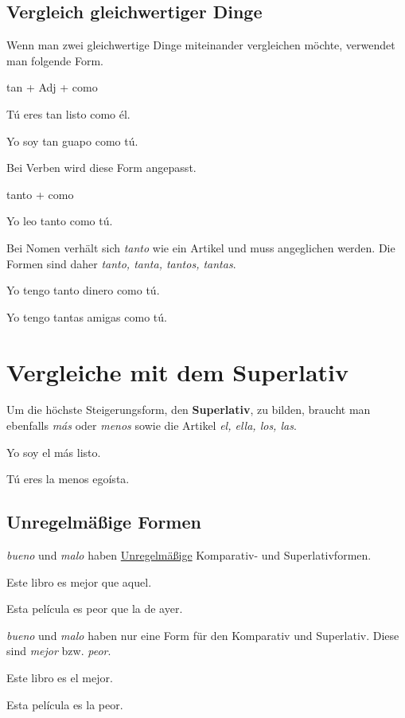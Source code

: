 \subsection*{Vergleich gleichwertiger Dinge}
Wenn man zwei gleichwertige Dinge miteinander vergleichen
möchte, verwendet man folgende Form.
\begin{gramatica}
    \item tan + Adj + como
\end{gramatica}
\begin{ejemplos}
    \item T\'u eres tan listo como \'el.
    \item Yo soy tan guapo como t\'u.
\end{ejemplos}
Bei Verben wird diese Form angepasst.
\begin{gramatica}
    \item tanto + como
\end{gramatica}
\begin{ejemplos}
    \item Yo leo tanto como t\'u.
\end{ejemplos}
Bei Nomen verhält sich \textit{tanto} wie ein Artikel und muss
angeglichen werden. Die Formen sind daher 
\textit{tanto, tanta, tantos, tantas}.
\begin{ejemplos}
    \item Yo tengo tanto dinero como t\'u.
    \item Yo tengo tantas amigas como t\'u.
\end{ejemplos}
\section{Vergleiche mit dem Superlativ}
Um die höchste Steigerungsform, den \textbf{Superlativ}, zu 
bilden, braucht man ebenfalls \textit{m\'as} oder \textit{menos}
sowie die Artikel \textit{el, ella, los, las}.
\begin{ejemplos}
    \item Yo soy el m\'as listo.
    \item T\'u eres la menos ego\'ista. 
\end{ejemplos}
\subsection*{Unregelmäßige Formen}
\textit{bueno} und \textit{malo} haben \underline{Unregelmäßige}
Komparativ- und Superlativformen.
\begin{ejemplos}
    \item Este libro es mejor que aquel.
    \item Esta pel\'icula es peor que la de ayer.
\end{ejemplos}
\textit{bueno} und \textit{malo} haben nur eine Form für
den Komparativ und Superlativ. Diese sind \textit{mejor} bzw.
\textit{peor}.
\begin{ejemplos}
    \item Este libro es el mejor.
    \item Esta pel\'icula es la peor.
\end{ejemplos}
